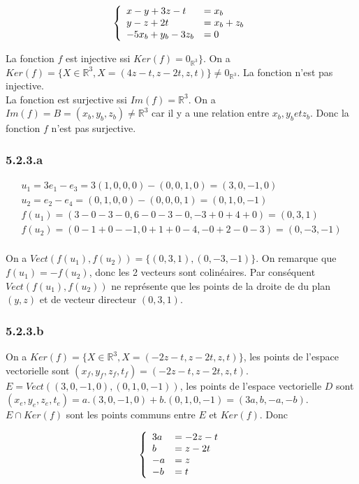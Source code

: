 \documentclass[]{book}
\theoremstyle{definition}
\newcommand{\bb}[1]{\mathbb{#1}}
\newcommand{\R}{\bb{R}}
\begin{document}
$$
\left\{ 
\begin{array}{l l}
x -y +3z -t & = x_b \\
y -z + 2t & = x_b+z_b \\
-5x_b +y_b -3 z_b & =  0 \\
\end{array}
\right. 
$$


La fonction $f$ est injective ssi $Ker(f) = 0_{\R^3}\}$. On a $Ker(f)= \{X \in \R^3, X=(4z-t,z-2t, z, t)\} \neq 0_{\R^3}$. La fonction n'est pas injective.\\

La fonction est surjective ssi $Im(f) = \R^3$. On a $Im(f) = B= (x_b,y_b,z_b) \neq \R^3$ car il y a une relation entre $x_b,y_b et z_b$. Donc la fonction $f$ n'est pas surjective.

\subsubsection*{5.2.3.a}
$$
\begin{array}{l}
u_1 = 3e_1-e_3 = 3(1,0,0,0)-(0,0,1,0) = (3,0,-1,0) \\
u_2 = e_2 -e_4 = (0,1,0,0) - (0,0,0,1) = (0,1,0,-1) \\
f(u_1) = (3 - 0 -3 - 0, 6 - 0 -3 -0, -3 + 0 +4 +0)= (0, 3 ,1) \\
f(u_2) = (0-1+0--1, 0 +1 + 0 -4, -0 + 2 -0 -3) = (0,-3,-1) \\
\end{array}
$$

On a $Vect(f(u_1), f(u_2)) = \{(0,3,1),(0,-3,-1)\}$. On remarque que $f(u_1)=-f(u_2)$, donc les 2 vecteurs sont colin\'eaires. Par cons\'equent $Vect(f(u_1), f(u_2))$ ne repr\'esente que les points de la droite de du plan $(y,z)$ et de vecteur directeur $(0,3,1)$.

\subsubsection*{5.2.3.b}
On a $Ker(f)=\{X \in \R^3, X=(-2z-t,z-2t, z, t)\}$,  les points de l'espace vectorielle sont $(x_f,y_f,z_f,t_f) = (-2z-t,z-2t, z, t)$.\\
$E=Vect((3,0,-1,0), (0,1,0,-1))$, les points de l'espace vectorielle $D$ sont $(x_e,y_e,z_e,t_e) = a.(3,0,-1,0) + b.(0,1,0,-1) = (3a,b,-a,-b)$.\\

$E \cap Ker(f)$ sont les points communs entre $E$ et $Ker(f)$. Donc

$$
\left\{ 
\begin{array}{l l}
3a & = -2z - t \\
b & = z-2t \\
-a & = z \\
-b & = t \\
\end{array}
\right. 
$$
\end{document}

